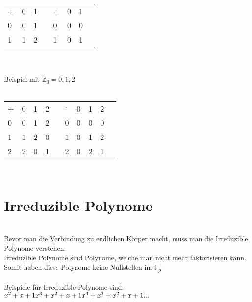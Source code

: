 \begin{table}[h]
    \begin{tabular}{l|l|lll|l|ll}
    + & 0 & 1 &  & + & 0 & 1 &  \\ \cline{1-3} \cline{5-7}
    0 & 0 & 1 &  & 0 & 0 & 0 &  \\ \cline{1-3} \cline{5-7}
    1 & 1 & 2 &  & 1 & 0 & 1 & 
    \end{tabular}
\end{table}
\\
\\
Beispiel mit $ \mathbb{Z}_3 = {0,1,2} $\\
\\
\begin{table}[h]
    \begin{tabular}{l|l|l|lll|l|l|ll}
    + & 0 & 1 & 2 &  & $\cdot$ & 0 & 1 & 2 &  \\ \cline{1-4} \cline{6-9}
    0 & 0 & 1 & 2 &  & 0 & 0 & 0 & 0 &  \\ \cline{1-4} \cline{6-9}
    1 & 1 & 2 & 0 &  & 1 & 0 & 1 & 2 &  \\ \cline{1-4} \cline{6-9}
    2 & 2 & 0 & 1 &  & 2 & 0 & 2 & 1 & 
    \end{tabular}
\end{table}
\\
\newpage
\section{Irreduzible Polynome}\\

Bevor man die Verbindung zu endlichen Körper macht, muss man die Irreduzible Polynome verstehen.\\
Irreduzible Polynome sind Polynome, welche man nicht mehr faktorisieren kann. Somit haben diese Polynome keine Nullstellen im $\mathbb{F}_{p} $
\\
\\
Beispiele für Irreduzible Polynome sind:\\
$
x^2+ x + 1\\
x^3 + x^2 + x + 1 \\
x^4 + x^3  + x^2 + x + 1\\
...
$
\\
\\
